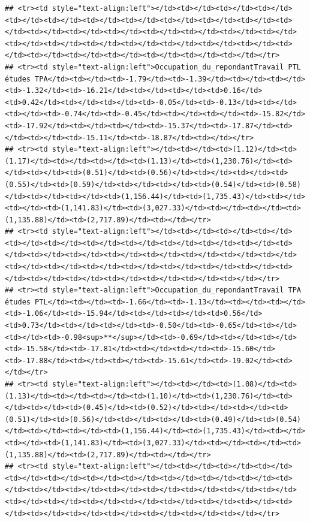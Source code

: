 \documentclass[
]{article}
\begin{document}
\begin{verbatim}
## <tr><td style="text-align:left"></td><td></td><td></td><td></td><td></td><td></td><td></td><td></td><td></td><td></td><td></td><td></td><td></td><td></td><td></td><td></td><td></td><td></td><td></td><td></td><td></td><td></td><td></td><td></td><td></td><td></td><td></td><td></td><td></td><td></td><td></td><td></td><td></td></tr>
## <tr><td style="text-align:left">Occupation_du_repondantTravail PTL études TPA</td><td></td><td>-1.79</td><td>-1.39</td><td></td><td></td><td>-1.32</td><td>-16.21</td><td></td><td></td><td>0.16</td><td>0.42</td><td></td><td></td><td>-0.05</td><td>-0.13</td><td></td><td></td><td>-0.74</td><td>-0.45</td><td></td><td></td><td>-15.82</td><td>-17.92</td><td></td><td></td><td>-15.37</td><td>-17.87</td><td></td><td></td><td>-15.11</td><td>-18.87</td><td></td></tr>
## <tr><td style="text-align:left"></td><td></td><td>(1.12)</td><td>(1.17)</td><td></td><td></td><td>(1.13)</td><td>(1,230.76)</td><td></td><td></td><td>(0.51)</td><td>(0.56)</td><td></td><td></td><td>(0.55)</td><td>(0.59)</td><td></td><td></td><td>(0.54)</td><td>(0.58)</td><td></td><td></td><td>(1,156.44)</td><td>(1,735.43)</td><td></td><td></td><td>(1,141.83)</td><td>(3,027.33)</td><td></td><td></td><td>(1,135.88)</td><td>(2,717.89)</td><td></td></tr>
## <tr><td style="text-align:left"></td><td></td><td></td><td></td><td></td><td></td><td></td><td></td><td></td><td></td><td></td><td></td><td></td><td></td><td></td><td></td><td></td><td></td><td></td><td></td><td></td><td></td><td></td><td></td><td></td><td></td><td></td><td></td><td></td><td></td><td></td><td></td><td></td></tr>
## <tr><td style="text-align:left">Occupation_du_repondantTravail TPA études PTL</td><td></td><td>-1.66</td><td>-1.13</td><td></td><td></td><td>-1.06</td><td>-15.94</td><td></td><td></td><td>0.56</td><td>0.73</td><td></td><td></td><td>-0.50</td><td>-0.65</td><td></td><td></td><td>-0.98<sup>**</sup></td><td>-0.69</td><td></td><td></td><td>-15.58</td><td>-17.81</td><td></td><td></td><td>-15.60</td><td>-17.88</td><td></td><td></td><td>-15.61</td><td>-19.02</td><td></td></tr>
## <tr><td style="text-align:left"></td><td></td><td>(1.08)</td><td>(1.13)</td><td></td><td></td><td>(1.10)</td><td>(1,230.76)</td><td></td><td></td><td>(0.45)</td><td>(0.52)</td><td></td><td></td><td>(0.51)</td><td>(0.56)</td><td></td><td></td><td>(0.49)</td><td>(0.54)</td><td></td><td></td><td>(1,156.44)</td><td>(1,735.43)</td><td></td><td></td><td>(1,141.83)</td><td>(3,027.33)</td><td></td><td></td><td>(1,135.88)</td><td>(2,717.89)</td><td></td></tr>
## <tr><td style="text-align:left"></td><td></td><td></td><td></td><td></td><td></td><td></td><td></td><td></td><td></td><td></td><td></td><td></td><td></td><td></td><td></td><td></td><td></td><td></td><td></td><td></td><td></td><td></td><td></td><td></td><td></td><td></td><td></td><td></td><td></td><td></td><td></td><td></td></tr>

\end{verbatim}
\end{document}
